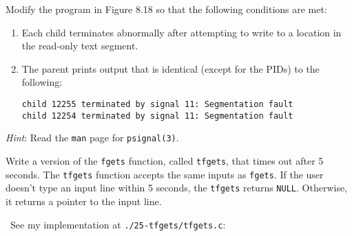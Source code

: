 \documentclass[12pt]{article}
\newenvironment{ex}[2][Exercise]{\begin{trivlist}
		\item[\hskip \labelsep {\bfseries #1}\hskip \labelsep {\bfseries #2.}]}{\end{trivlist}}
\newenvironment{sol}[1][Solution]{\begin{trivlist}
		\item[\hskip \labelsep {\bfseries #1:}]}{\end{trivlist}}
\begin{document}
\begin{ex}{8.24}
	Modify the program in Figure 8.18 so that the following conditions are met:
	\begin{enumerate}[label=(\alph*)]
		\item Each child terminates abnormally after attempting to write to a location in the
		read-only text segment.
		\item The parent prints output that is identical (except for the PIDs) to the following:
		\begin{lstlisting}[language={}]
child 12255 terminated by signal 11: Segmentation fault
child 12254 terminated by signal 11: Segmentation fault
		\end{lstlisting}
	\end{enumerate}
	\emph{Hint}: Read the \texttt{man} page for \texttt{psignal(3)}.
\end{ex}

\begin{ex}{8.25}
	Write a version of the \texttt{fgets} function, called \texttt{tfgets}, that times out after
	5 seconds. The \texttt{tfgets} function accepts the same inputs as \texttt{fgets}. If the user
	doesn't type an input line within 5 seconds, the \texttt{tfgets} returns \texttt{NULL}. Otherwise,
	it returns a pointer to the input line.
\end{ex}

\begin{sol}
	\
	See my implementation at \texttt{./25-tfgets/tfgets.c}:
	
\end{sol}
\end{document}
